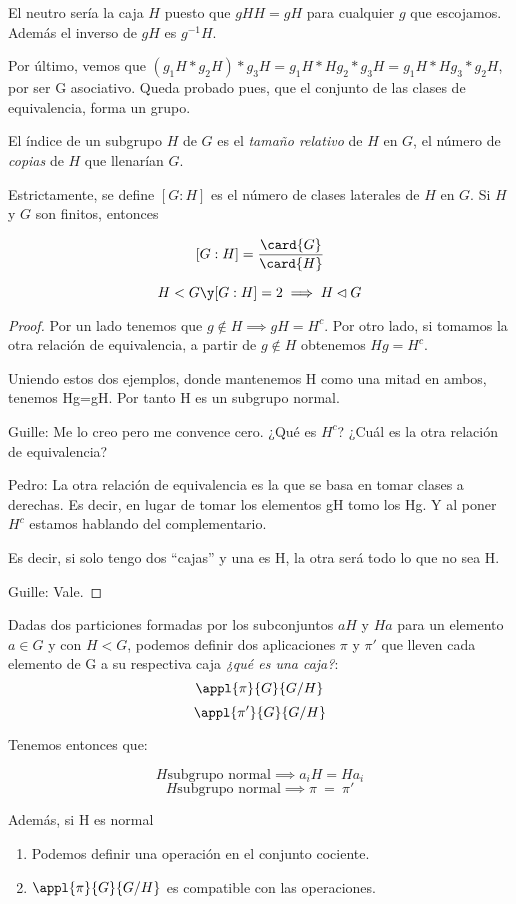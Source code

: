 \documentclass[nochap]{apuntes}
\begin{document}
  El neutro sería la caja $H$ puesto que $gHH=gH$ para cualquier $g$ que escojamos. Además el inverso de $gH$ es $g^{-1}H$.
  
  Por último, vemos que $(g_{1}H\ast g_{2}H)\ast g_{3}H=g_{1}H\ast Hg_{2}\ast g_{3}H=g_{1}H\ast Hg_{3}\ast g_{2}H$, por ser G asociativo. Queda probado pues, que el conjunto de las clases de equivalencia, forma un grupo.
  
\begin{defn}\label{defIndiceSG} El índice de un subgrupo $H$ de $G$ es el \textit{tamaño relativo} de $H$ en $G$, el número de \textit{copias} de $H$ que llenarían $G$.  

Estrictamente, se define $[G:H]$ es el número de clases laterales de $H$ en $G$. Si $H$ y $G$ son finitos, entonces 

\[ [G:H] = \frac{\card{G}}{\card{H}} \]
\end{defn}
  
  \begin{theorem}
   \[ H< G \y [G:H]=2 \implies H \lhd G \]
  \end{theorem}
  
  \begin{proof}
   Por un lado tenemos que $g\notin H \implies gH= H^{c}$. Por otro lado, si tomamos la otra relación de equivalencia, a partir de $g \notin H$ obtenemos $Hg=H^{c}$.
   
   Uniendo estos dos ejemplos, donde mantenemos H como una mitad en ambos, tenemos Hg=gH. Por tanto H es un subgrupo normal.
   
   Guille: Me lo creo pero me convence cero. ¿Qué es $H^c$? ¿Cuál es la otra relación de equivalencia?
   
   Pedro: La otra relación de equivalencia es la que se basa en tomar clases a derechas. Es decir, en lugar de tomar los elementos
   gH tomo los Hg. Y al poner $H^{c}$  estamos hablando del complementario.
   
   Es decir, si solo tengo dos ``cajas'' y una es H, la otra será todo lo que no sea H.
   
   Guille: Vale.
  \end{proof}
  
  \begin{lemma}
   Dadas dos particiones formadas por los subconjuntos $aH$ y $Ha$ para un elemento $a \in G$ y con $H <G$, podemos definir dos aplicaciones $\pi$ y $\pi '$ que lleven cada elemento de G a su respectiva caja \textit{¿qué es una caja?}:
   \[ \appl{\pi}{G}{G/H} \]
   \[ \appl{\pi'}{G}{G/H} \]
   
   Tenemos entonces que:
   
   \[ H \text{subgrupo normal} \implies a_iH = Ha_i \]
   \[ H \text{subgrupo normal} \implies \pi \ =\ \pi ' \]
   
   Además, si H es normal
   \begin{enumerate}
	\item Podemos definir una operación en el conjunto cociente.     
	\item $\appl{\pi}{G}{G/H}$ es compatible con las operaciones.
   \end{enumerate}

  \end{lemma}
  
\end{document}
